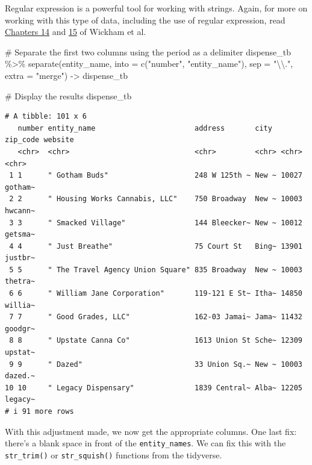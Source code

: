 \documentclass[
  letterpaper,
]{book}
\newenvironment{Shaded}{\begin{snugshade}}{\end{snugshade}}
\newcommand{\AttributeTok}[1]{\textcolor[rgb]{0.40,0.45,0.13}{#1}}
\newcommand{\CommentTok}[1]{\textcolor[rgb]{0.37,0.37,0.37}{#1}}
\newcommand{\FunctionTok}[1]{\textcolor[rgb]{0.28,0.35,0.67}{#1}}
\newcommand{\NormalTok}[1]{\textcolor[rgb]{0.00,0.23,0.31}{#1}}
\newcommand{\OtherTok}[1]{\textcolor[rgb]{0.00,0.23,0.31}{#1}}
\newcommand{\SpecialCharTok}[1]{\textcolor[rgb]{0.37,0.37,0.37}{#1}}
\newcommand{\StringTok}[1]{\textcolor[rgb]{0.13,0.47,0.30}{#1}}
\begin{document}
Regular expression is a powerful tool for working with strings. Again,
for more on working with this type of data, including the use of regular
expression, read \href{https://r4ds.hadley.nz/strings}{Chapters 14} and
\href{https://r4ds.hadley.nz/regexps}{15} of Wickham et al.

\begin{Shaded}
\begin{Highlighting}[]
\CommentTok{\# Separate the first two columns using the period as a delimiter}
\NormalTok{dispense\_tb }\SpecialCharTok{\%\textgreater{}\%}
  \FunctionTok{separate}\NormalTok{(entity\_name,}
           \AttributeTok{into =} \FunctionTok{c}\NormalTok{(}\StringTok{"number"}\NormalTok{, }\StringTok{"entity\_name"}\NormalTok{), }
           \AttributeTok{sep =} \StringTok{"}\SpecialCharTok{\textbackslash{}\textbackslash{}}\StringTok{."}\NormalTok{, }
           \AttributeTok{extra =} \StringTok{"merge"}\NormalTok{) }\OtherTok{{-}\textgreater{}}\NormalTok{ dispense\_tb}

\CommentTok{\# Display the results}
\NormalTok{dispense\_tb}
\end{Highlighting}
\end{Shaded}

\begin{verbatim}
# A tibble: 101 x 6
   number entity_name                       address       city  zip_code website
   <chr>  <chr>                             <chr>         <chr> <chr>    <chr>  
 1 1      " Gotham Buds"                    248 W 125th ~ New ~ 10027    gotham~
 2 2      " Housing Works Cannabis, LLC"    750 Broadway  New ~ 10003    hwcann~
 3 3      " Smacked Village"                144 Bleecker~ New ~ 10012    getsma~
 4 4      " Just Breathe"                   75 Court St   Bing~ 13901    justbr~
 5 5      " The Travel Agency Union Square" 835 Broadway  New ~ 10003    thetra~
 6 6      " William Jane Corporation"       119-121 E St~ Itha~ 14850    willia~
 7 7      " Good Grades, LLC"               162-03 Jamai~ Jama~ 11432    goodgr~
 8 8      " Upstate Canna Co"               1613 Union St Sche~ 12309    upstat~
 9 9      " Dazed"                          33 Union Sq.~ New ~ 10003    dazed.~
10 10     " Legacy Dispensary"              1839 Central~ Alba~ 12205    legacy~
# i 91 more rows
\end{verbatim}

With this adjustment made, we now get the appropriate columns. One last
fix: there's a blank space in front of the \texttt{entity\_names}. We
can fix this with the \texttt{str\_trim()} or \texttt{str\_squish()}
functions from the tidyverse.
\end{document}
